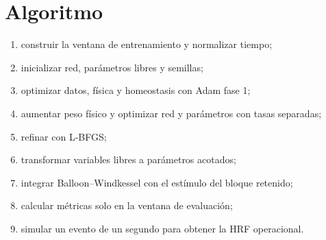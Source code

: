 \section{Algoritmo}
\begin{enumerate}
  \item construir la ventana de entrenamiento y normalizar tiempo;
  \item inicializar red, parámetros libres y semillas;
  \item optimizar datos, física y homeostasis con Adam fase 1;
  \item aumentar peso físico y optimizar red y parámetros con tasas separadas;
  \item refinar con L-BFGS;
  \item transformar variables libres a parámetros acotados;
  \item integrar Balloon--Windkessel con el estímulo del bloque retenido;
  \item calcular métricas solo en la ventana de evaluación;
  \item simular un evento de un segundo para obtener la HRF operacional.
\end{enumerate}
